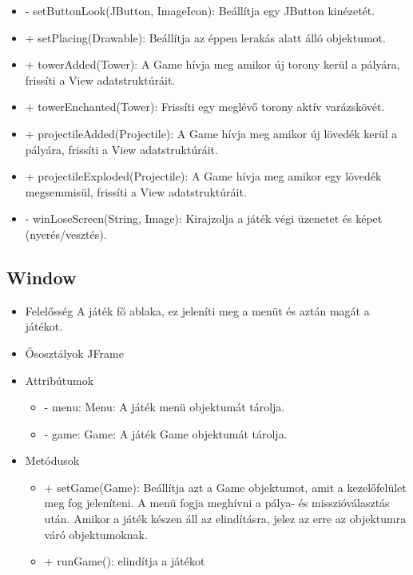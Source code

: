 \begin{itemize}
\begin{itemize}
		\item - setButtonLook(JButton, ImageIcon): Beállítja egy JButton kinézetét.
		\item + setPlacing(Drawable): Beállítja az éppen lerakás alatt álló objektumot.
		\item + towerAdded(Tower): A Game hívja meg amikor új torony kerül a pályára, frissíti a View adatstruktúráit.
		\item + towerEnchanted(Tower): Frissíti egy meglévő torony aktív varázskövét.
		\item + projectileAdded(Projectile): A Game hívja meg amikor új lövedék kerül a pályára, frissíti a View adatstruktúráit.
		\item + projectileExploded(Projectile): A Game hívja meg amikor egy lövedék megsemmisül, frissíti a View adatstruktúráit.
		\item - winLoseScreen(String, Image): Kirajzolja a játék végi üzenetet és képet (nyerés/vesztés).
	\end{itemize}
\end{itemize}

\subsection{Window}
\begin{itemize}
\item Felelősség \newline
A játék fő ablaka, ez jeleníti meg a menüt és aztán magát a játékot.
\item Ősosztályok\newline
JFrame
\item Attribútumok
	\begin{itemize}
		\item - menu: Menu: A játék menü objektumát tárolja.
		\item - game: Game: A játék Game objektumát tárolja.
	\end{itemize}
\item Metódusok
	\begin{itemize}
		\item + setGame(Game): Beállítja azt a Game objektumot, amit a kezelőfelület meg fog jeleníteni. A menü fogja meghívni a pálya- és misszióválasztás után. 
		Amikor a játék készen áll az elindításra, jelez az erre az objektumra váró objektumoknak.
		\item + runGame(): elindítja a játékot
	\end{itemize}
\end{itemize}

